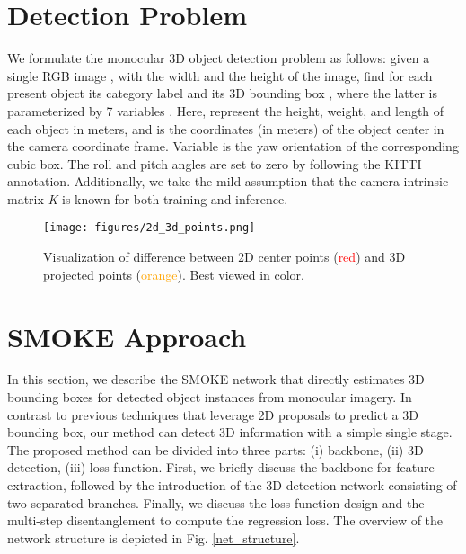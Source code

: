 \documentclass[10pt,twocolumn,letterpaper]{article}
\begin{document}
    


\section{Detection Problem} \label{Sec:detect}
    We formulate the monocular 3D object detection problem as follows: given a single RGB image , with  the width and  the height of the image, find for each present object its category label  and its 3D bounding box , where the latter is parameterized by 7 variables . Here,  represent the height, weight, and length of each object in meters, and  is the coordinates (in meters) of the object center in the camera coordinate frame. Variable  is the yaw orientation of the corresponding cubic box. The roll and pitch angles are set to zero by following the KITTI \cite{kitti} annotation. Additionally, we take the mild assumption that the camera intrinsic matrix \textit{K} is known for both training and inference.
\begin{figure}[t]
        \centering
        \texttt{[image: figures/2d\_3d\_points.png]}
        \caption{Visualization of difference between 2D center points (\textcolor{red}{red}) and 3D projected points (\textcolor{orange}{orange}). Best viewed in color.} \vspace{-4mm}
        \label{2d_3d_points}
    \end{figure}
    
\section{SMOKE Approach} \label{sec:SMOKE}
    In this section, we describe the SMOKE network that directly estimates 3D bounding boxes for detected object instances from monocular imagery. In contrast to previous techniques that leverage 2D proposals to predict a 3D bounding box, our method can detect 3D information with a simple single stage. The proposed method can be divided into three parts: (i) backbone, (ii) 3D detection, (iii) loss function. First, we briefly discuss the backbone for feature extraction, followed by the introduction of the 3D detection network consisting of two separated branches. Finally, we discuss the loss function design and the multi-step disentanglement to compute the regression loss. The overview of the network structure is depicted in Fig. \ref{net_structure}.
    
\end{document}
